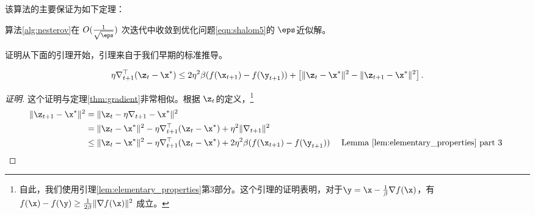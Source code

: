 该算法的主要保证为如下定理：
\begin{theorem}
算法\ref{alg:nesterov}在 $ O( \frac{1}{\sqrt{\eps} } )  $ 次迭代中收敛到优化问题\eqref{eqn:shalom5}的 $\eps$近似解。
\end{theorem}

证明从下面的引理开始，引理来自于我们早期的标准推导。
\begin{lemma} \label{lem:shalom3}
$$ \eta \nabla_{t+1}^\top  ( \z_{t} - \x^*)  \leq 2{ \eta^2 \beta} (f(\x_{t+1} )- f(\y_{t+1}) ) +  \left[ \| \z_t - \x^*\|^2 - \| \z_{t+1} -\x^*\|^2 \right] . $$
\end{lemma}
\begin{proof}[证明]
这个证明与定理\ref{thm:gradient}非常相似。根据 $\z_t$的定义，\footnote{自此，我们使用引理\ref{lem:elementary_properties}第3部分。这个引理的证明表明，对于$\y = \x - \frac{1}{\beta} \nabla f(\x)$，有 $f(\x) - f(\y) \geq \frac{1}{2\beta} \|\nabla f(\x)\|^2$ 成立。}
\begin{eqnarray*}
\| \z_{t+1} - \x^*\|^2 & = \| \z_{t} - \eta \nabla_{t+1} - \x^* \|^2 \\
& = \| \z_{t} - \x^*\|^2 - \eta \nabla_{t+1}^\top ( \z_{t} - \x^*) + \eta^2 \| \nabla_{t+1}\|^2 \\
& \leq \| \z_{t} - \x^*\|^2 - \eta \nabla_{t+1}^\top( \z_{t} - \x^*) + 2 {\eta^2 \beta} (f(\x_{t+1}) - f(\y_{t+1}))   & \mbox{ Lemma \ref{lem:elementary_properties} part 3  } 
\end{eqnarray*}

\end{proof}


